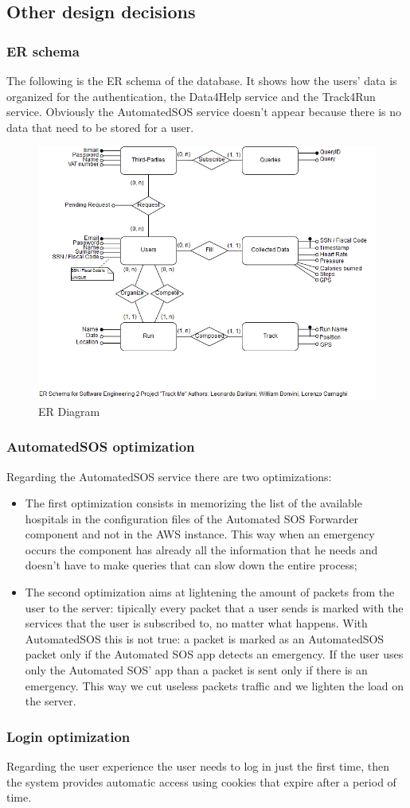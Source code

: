 {\color{secblue}\subsection{Other design decisions}}
{\color{secblue}\subsubsection{ER schema}}
The following is the ER schema of the database. It shows how the users' data is organized for the authentication, the Data4Help service and the Track4Run service. Obviously the AutomatedSOS service doesn't appear because there is no data that need to be stored for a user.
\begin{figure}[H]
    \includegraphics[width=\linewidth, keepaspectratio]{./Images/er.png}
    \centering
    \caption{ER Diagram}
    \label{fig:depview}
  \end{figure}
{\color{secblue}\subsubsection{AutomatedSOS optimization}}
Regarding the AutomatedSOS service there are two optimizations:
\begin{itemize}
\item The first optimization consists in memorizing the list of the available hospitals in the configuration files of the Automated SOS Forwarder component and not in the AWS instance. This way when an emergency occurs the component has already all the information that he needs and doesn't have to make queries that can slow down the entire process;
\item The second optimization aims at lightening the amount of packets from the user to the server: tipically every packet that a user sends is marked with the services that the user is subscribed to, no matter what happens. With AutomatedSOS this is not true: a packet is marked as an AutomatedSOS packet only if the Automated SOS app detects an emergency. If the user uses only the Automated SOS' app than a packet is sent only if there is an emergency. This way we cut useless packets traffic and we lighten the load on the server.
\end{itemize}
{\color{secblue}\subsubsection{Login optimization}}
Regarding the user experience the user needs to log in just the first time, then the system provides automatic access using cookies that expire after a period of time.